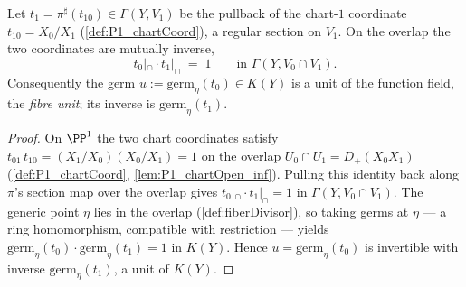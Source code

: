\begin{definition}
  \label{def:fiberCoordUnit}
  \leanok
  Let \(t_1 = \pi^{\sharp}(t_{10}) \in \Gamma(Y, V_1)\) be the pullback of the chart-\(1\) coordinate
  \(t_{10} = X_0/X_1\) (\ref{def:P1_chartCoord}), a regular section on \(V_1\). On the overlap the
  two coordinates are mutually inverse,
  \[
    t_0|_{\cap} \cdot t_1|_{\cap} \;=\; 1 \qquad \text{in } \Gamma(Y, V_0 \cap V_1).
  \]
  Consequently the germ \(u := \mathrm{germ}_{\eta}(t_0) \in K(Y)\) is a unit of the function field,
  the \emph{fibre unit}; its inverse is \(\mathrm{germ}_{\eta}(t_1)\).
\end{definition}
\begin{proof}
  \leanok
  On \(\PP^1\) the two chart coordinates satisfy \(t_{01}\,t_{10} = (X_1/X_0)(X_0/X_1) = 1\) on the
  overlap \(U_0 \cap U_1 = D_+(X_0 X_1)\) (\ref{def:P1_chartCoord}, \ref{lem:P1_chartOpen_inf}).
  Pulling this identity back along \(\pi\)'s section map over the overlap gives \(t_0|_{\cap} \cdot
  t_1|_{\cap} = 1\) in \(\Gamma(Y, V_0 \cap V_1)\). The generic point \(\eta\) lies in the overlap
  (\ref{def:fiberDivisor}), so taking germs at \(\eta\) --- a ring homomorphism, compatible with
  restriction --- yields \(\mathrm{germ}_{\eta}(t_0)\cdot \mathrm{germ}_{\eta}(t_1) = 1\) in
  \(K(Y)\). Hence \(u = \mathrm{germ}_{\eta}(t_0)\) is invertible with inverse
  \(\mathrm{germ}_{\eta}(t_1)\), a unit of \(K(Y)\).
\end{proof}

